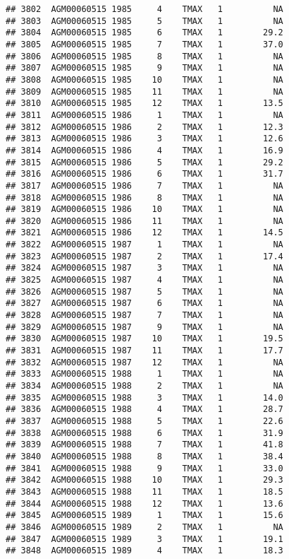 \documentclass{article}\usepackage[]{graphicx}\usepackage[]{color}
\makeatletter
\newenvironment{kframe}{%
 \def\at@end@of@kframe{}%
 \ifinner\ifhmode%
  \def\at@end@of@kframe{\end{minipage}}%
  \begin{minipage}{\columnwidth}%
 \fi\fi%
 \def\FrameCommand##1{\hskip\@totalleftmargin \hskip-\fboxsep
 \colorbox{shadecolor}{##1}\hskip-\fboxsep
     \hskip-\linewidth \hskip-\@totalleftmargin \hskip\columnwidth}%
 \MakeFramed {\advance\hsize-\width
   \@totalleftmargin\z@ \linewidth\hsize
   \@setminipage}}%
 {\par\unskip\endMakeFramed%
 \at@end@of@kframe}
\newenvironment{knitrout}{}{} %
\makeatother
\begin{document}
\begin{knitrout}
\begin{kframe}
\begin{verbatim}
## 3802  AGM00060515 1985     4    TMAX   1          NA
## 3803  AGM00060515 1985     5    TMAX   1          NA
## 3804  AGM00060515 1985     6    TMAX   1        29.2
## 3805  AGM00060515 1985     7    TMAX   1        37.0
## 3806  AGM00060515 1985     8    TMAX   1          NA
## 3807  AGM00060515 1985     9    TMAX   1          NA
## 3808  AGM00060515 1985    10    TMAX   1          NA
## 3809  AGM00060515 1985    11    TMAX   1          NA
## 3810  AGM00060515 1985    12    TMAX   1        13.5
## 3811  AGM00060515 1986     1    TMAX   1          NA
## 3812  AGM00060515 1986     2    TMAX   1        12.3
## 3813  AGM00060515 1986     3    TMAX   1        12.6
## 3814  AGM00060515 1986     4    TMAX   1        16.9
## 3815  AGM00060515 1986     5    TMAX   1        29.2
## 3816  AGM00060515 1986     6    TMAX   1        31.7
## 3817  AGM00060515 1986     7    TMAX   1          NA
## 3818  AGM00060515 1986     8    TMAX   1          NA
## 3819  AGM00060515 1986    10    TMAX   1          NA
## 3820  AGM00060515 1986    11    TMAX   1          NA
## 3821  AGM00060515 1986    12    TMAX   1        14.5
## 3822  AGM00060515 1987     1    TMAX   1          NA
## 3823  AGM00060515 1987     2    TMAX   1        17.4
## 3824  AGM00060515 1987     3    TMAX   1          NA
## 3825  AGM00060515 1987     4    TMAX   1          NA
## 3826  AGM00060515 1987     5    TMAX   1          NA
## 3827  AGM00060515 1987     6    TMAX   1          NA
## 3828  AGM00060515 1987     7    TMAX   1          NA
## 3829  AGM00060515 1987     9    TMAX   1          NA
## 3830  AGM00060515 1987    10    TMAX   1        19.5
## 3831  AGM00060515 1987    11    TMAX   1        17.7
## 3832  AGM00060515 1987    12    TMAX   1          NA
## 3833  AGM00060515 1988     1    TMAX   1          NA
## 3834  AGM00060515 1988     2    TMAX   1          NA
## 3835  AGM00060515 1988     3    TMAX   1        14.0
## 3836  AGM00060515 1988     4    TMAX   1        28.7
## 3837  AGM00060515 1988     5    TMAX   1        22.6
## 3838  AGM00060515 1988     6    TMAX   1        31.9
## 3839  AGM00060515 1988     7    TMAX   1        41.8
## 3840  AGM00060515 1988     8    TMAX   1        38.4
## 3841  AGM00060515 1988     9    TMAX   1        33.0
## 3842  AGM00060515 1988    10    TMAX   1        29.3
## 3843  AGM00060515 1988    11    TMAX   1        18.5
## 3844  AGM00060515 1988    12    TMAX   1        13.6
## 3845  AGM00060515 1989     1    TMAX   1        15.6
## 3846  AGM00060515 1989     2    TMAX   1          NA
## 3847  AGM00060515 1989     3    TMAX   1        19.1
## 3848  AGM00060515 1989     4    TMAX   1        18.3

\end{verbatim}
\end{kframe}
\end{knitrout}
\end{document}
